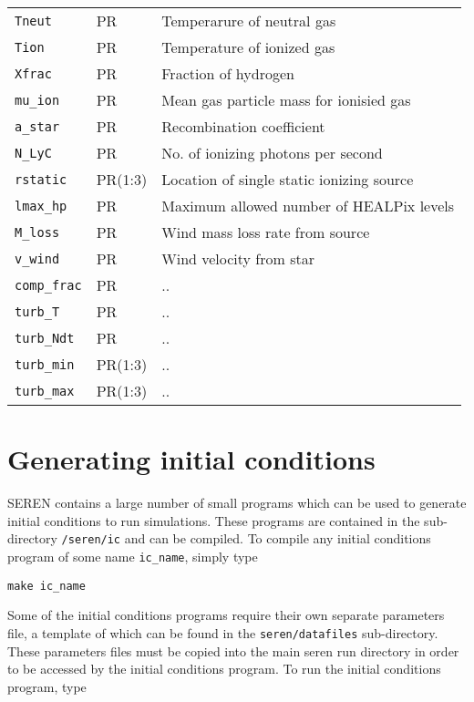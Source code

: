 \documentclass[a4paper]{article}
\newcommand{\var}[1]{\texttt{#1}}
\begin{document}
\begin{center}
\begin{supertabular}{|p{3cm}|p{2cm}|p{8cm}|}
\var{Tneut}          & PR       & Temperarure of neutral gas \\
\var{Tion}           & PR       & Temperature of ionized gas \\
\var{Xfrac}          & PR       & Fraction of hydrogen \\
\var{mu\_ion}        & PR       & Mean gas particle mass for ionisied gas \\
\var{a\_star}        & PR       & Recombination coefficient \\
\var{N\_LyC}         & PR       & No. of ionizing photons per second \\
\var{rstatic}        & PR(1:3)  & Location of single static ionizing source \\
\var{lmax\_hp}       & PR       & Maximum allowed number of HEALPix levels \\
\var{M\_loss}        & PR       & Wind mass loss rate from source \\
\var{v\_wind}        & PR       & Wind velocity from star \\ \hline
\var{comp\_frac}     & PR       & .. \\
\var{turb\_T}        & PR       & .. \\
\var{turb\_Ndt}      & PR       & .. \\
\var{turb\_min}      & PR(1:3)  & .. \\
\var{turb\_max}      & PR(1:3)  & .. \\ \hline
\end{supertabular}
\end{center}
\vspace{1cm}


\newpage



\section{Generating initial conditions} \label{SS:ICS}
SEREN contains a large number of small programs which can be used to generate initial conditions to run simulations.  These programs are contained in the sub-directory \var{/seren/ic} and can be compiled.  To compile any initial conditions program of some name \var{ic\_name}, simply type \newline 

\var{make ic\_name} \newline

\noindent Some of the initial conditions programs require their own separate parameters file, a template of which can be found in the \var{seren/datafiles} sub-directory.  These parameters files must be copied into the main seren run directory in order to be accessed by the initial conditions program.  To run the initial conditions program, type \newline
\end{document}
